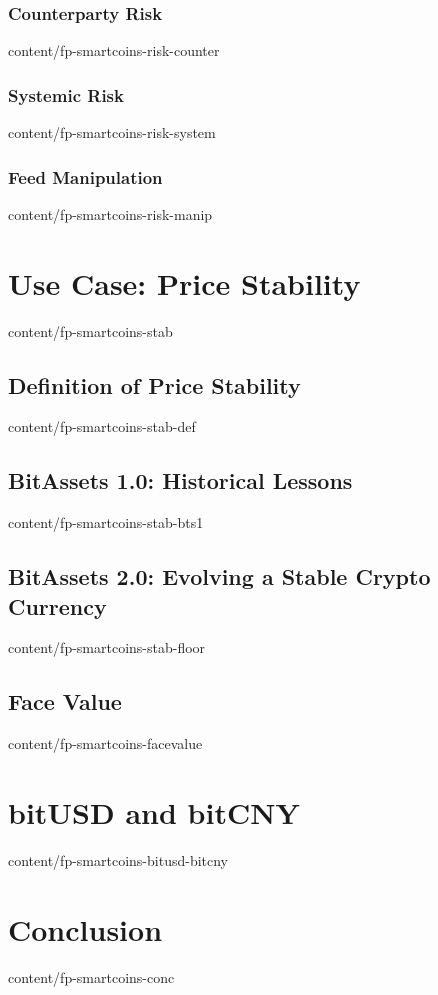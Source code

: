 \documentclass{btswhitepaper}
\begin{document}
\subsubsection { Counterparty Risk                                }  { content/fp-smartcoins-risk-counter}
\subsubsection { Systemic Risk                                    }  { content/fp-smartcoins-risk-system }
\subsubsection { Feed Manipulation                                }  { content/fp-smartcoins-risk-manip  }

\section       { Use Case: Price Stability                        }  { content/fp-smartcoins-stab        }
\subsection    { Definition of Price Stability                    }  { content/fp-smartcoins-stab-def    }
\subsection    { BitAssets 1.0: Historical Lessons                }  { content/fp-smartcoins-stab-bts1   }
\subsection    { BitAssets 2.0: Evolving a Stable Crypto Currency }  { content/fp-smartcoins-stab-floor  }
\subsection    { Face Value                                       }  { content/fp-smartcoins-facevalue   }

\section       { bitUSD and bitCNY                        }  { content/fp-smartcoins-bitusd-bitcny        }

\section       { Conclusion                                       }  { content/fp-smartcoins-conc        }


\end{document}
